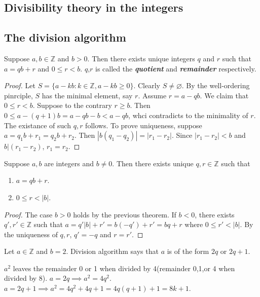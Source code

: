 \documentclass{article}
\begin{document}
\begin{multicols}{2}
\section{Divisibility theory in the integers}
\subsection{The division algorithm}
\begin{mytheorem}
Suppose $a,b\in \mathbb{Z}$ and $b>0$. Then there exists unique integers $q$ and $r$ such that $a=qb+r$ and $0\leq r<b$. $q$,$r$ is called the \textbf{\emph{quotient}} and \textbf{\emph{remainder}} respectively.
\end{mytheorem}
\begin{proof}
Let $S=\{a-kb:k\in \mathbb{Z},a-kb\geq 0\}$. Clearly $S\neq \varnothing$. By the well-ordering pinrciple, $S$ has the minimal element, say $r$. Assume $r=a-qb$. We claim that $0\leq r<b$. Suppose to the contrary $r\geq b$. Then $0\leq a-(q+1)b=a-qb-b< a-qb$, whci contradicts to the minimality of $r$. The existance of such $q,r$ follows. To prove uniqueness, suppose $a=q_1b+r_1=q_2b+r_2$. Then $|b(q_1-q_2)|=|r_1-r_2|$. Since $|r_1-r_2|<b$ and $b|(r_1-r_2)$, $r_1=r_2$.
\end{proof} 

\begin{mycorollary}
Suppose $a,b$ are integers and $b\neq 0$. Then there exists unique $q,r\in \mathbb{Z}$ such that
\begin{enumerate}[label={(\alph*)}]
\item $a=qb+r$.
\item $0\leq r<|b|$.
\end{enumerate} 
\end{mycorollary}
\begin{proof}
The case $b>0$ holds by the previous theorem. If $b<0$, there exists $q',r'\in \mathbb{Z}$ such that $a=q'|b|+r'=b(-q')+r'=bq+r$ where $0\leq r'<|b|$. By the uniqueness of $q,r$, $q' = -q$ and $r=r'$.
\end{proof}

\begin{example}
Let $a\in \mathbb{Z}$ and $b=2$. Division algorithm says that $a$ is of the form $2q$ or $2q+1$.
\end{example}

\begin{example}
$a^2$ leaves the remainder 0 or 1 when divided by 4(remainder 0,1,or 4 when divided by 8). $a=2q\implies a^2=4q^2$. $a=2q+1 \implies a^2=4q^2+4q+1=4q(q+1)+1=8k+1$.
\end{example}


\end{multicols}
\end{document}
